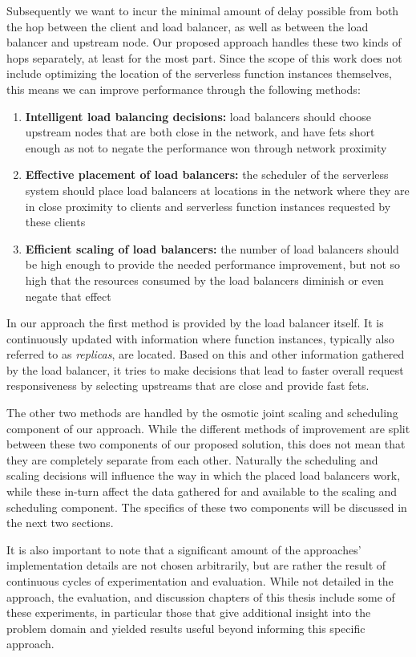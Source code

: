 Subsequently we want to incur the minimal amount of delay possible from both the hop between the client and load balancer, as well as between the load balancer and upstream node. Our proposed approach handles these two kinds of hops separately, at least for the most part. Since the scope of this work does not include optimizing the location of the serverless function instances themselves, this means we can improve performance through the following methods:
\begin{enumerate}
    \item \textbf{Intelligent load balancing decisions:} load balancers should choose upstream nodes that are both close in the network, and have \glspl{fet} short enough as not to negate the performance won through network proximity
    \item \textbf{Effective placement of load balancers:} the scheduler of the serverless system should place load balancers at locations in the network where they are in close proximity to clients and serverless function instances requested by these clients
    \item \textbf{Efficient scaling of load balancers:} the number of load balancers should be high enough to provide the needed performance improvement, but not so high that the resources consumed by the load balancers diminish or even negate that effect
\end{enumerate}
In our approach the first method is provided by the load balancer itself. It is continuously updated with information where function instances, typically also referred to as \textit{replicas}, are located. Based on this and other information gathered by the load balancer, it tries to make decisions that lead to faster overall request responsiveness by selecting upstreams that are close and provide fast \glspl{fet}.

The other two methods are handled by the osmotic joint scaling and scheduling component of our approach. While the different methods of improvement are split between these two components of our proposed solution, this does not mean that they are completely separate from each other. Naturally the scheduling and scaling decisions will influence the way in which the placed load balancers work, while these in-turn affect the data gathered for and available to the scaling and scheduling component. The specifics of these two components will be discussed in the next two sections. 

It is also important to note that a significant amount of the approaches' implementation details are not chosen arbitrarily, but are rather the result of continuous cycles of experimentation and evaluation. While not detailed in the approach, the evaluation, and discussion chapters of this thesis include some of these experiments, in particular those that give additional insight into the problem domain and yielded results useful beyond informing this specific approach.